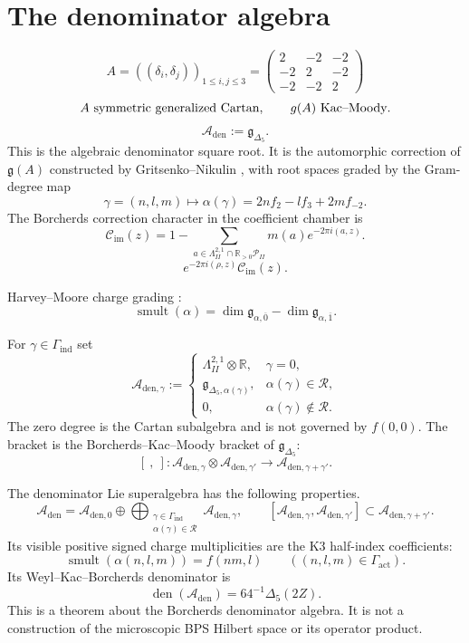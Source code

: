 \documentclass[11pt]{memoir}
\newcommand{\R}{\mathbb{R}} \newcommand{\La}{\Lambda}
\newcommand{\Poly}{\mathcal{P}}
\newcommand{\bkm}{\mathfrak{g}}
\newcommand{\smult}{\operatorname{smult}}
\newcommand{\autcor}{\mathfrak{g}_{\Delta_5}}
\begin{document}
\section{The denominator algebra}

$$A=((\delta_i,\delta_j))_{1\leq i,j\leq3}
=\begin{pmatrix}2&-2&-2\\-2&2&-2\\-2&-2&2\end{pmatrix}$$
$$A\ \hbox{symmetric generalized Cartan},\qquad
\bkm(A)\ \hbox{Kac--Moody}.$$
$$\mathcal A_{\mathrm{den}}:=\autcor.$$
This is the algebraic denominator square root.  It is the automorphic
correction of $\bkm(A)$ constructed by Gritsenko--Nikulin \cite{GN},
with root spaces graded by the Gram-degree map
$$
\gamma=(n,l,m)\longmapsto
\alpha(\gamma)=2nf_2-lf_3+2mf_{-2}.
$$
The Borcherds correction character in the coefficient chamber is
$$\mathcal C_{\mathrm{im}}(z)
=1-\sum_{a\in\La^{2,1}_{II}\cap\R_{>0}\Poly_{II}}
m(a)e^{-2\pi i(a,z)}.$$
$$e^{-2\pi i(\rho,z)}\mathcal C_{\mathrm{im}}(z).$$

Harvey--Moore charge grading \cite{HM}:
$$\smult(\alpha)
=\dim\mathfrak{g}_{\alpha,\overline 0}
-\dim\mathfrak{g}_{\alpha,\overline 1}.$$

\begin{definition}
For $\gamma\in\Gamma_{\mathrm{ind}}$ set
$$
\mathcal A_{\mathrm{den},\gamma}
:=
\begin{cases}
\La^{2,1}_{II}\otimes\R,&\gamma=0,\\
\mathfrak g_{\Delta_5,\alpha(\gamma)},&\alpha(\gamma)\in\mathcal R,\\
0,&\alpha(\gamma)\notin\mathcal R.
\end{cases}
$$
The zero degree is the Cartan subalgebra and is not governed by
\(f(0,0)\).  The bracket is the Borcherds--Kac--Moody bracket of
\(\autcor\):
$$
[\ ,\ ]:
\mathcal A_{\mathrm{den},\gamma}
\otimes
\mathcal A_{\mathrm{den},\gamma'}
\longrightarrow
\mathcal A_{\mathrm{den},\gamma+\gamma'}.
$$
\end{definition}

\begin{theorem}
\label{thm:bracket-level-square-root}
The denominator Lie superalgebra has the following properties.
$$
\mathcal A_{\mathrm{den}}
=\mathcal A_{\mathrm{den},0}\oplus
\bigoplus_{\substack{\gamma\in\Gamma_{\mathrm{ind}}\\
\alpha(\gamma)\in\mathcal R}}
\mathcal A_{\mathrm{den},\gamma},
\qquad
[\mathcal A_{\mathrm{den},\gamma},\mathcal A_{\mathrm{den},\gamma'}]
\subset \mathcal A_{\mathrm{den},\gamma+\gamma'}.
$$
Its visible positive signed charge multiplicities are the K3 half-index
coefficients:
$$
\smult(\alpha(n,l,m))=f(nm,l)
\qquad((n,l,m)\in\Gamma_{\mathrm{act}}).
$$
Its Weyl--Kac--Borcherds denominator is
$$
\operatorname{den}(\mathcal A_{\mathrm{den}})
=64^{-1}\Delta_5(2Z).
$$
This is a theorem about the Borcherds denominator algebra.  It is not a
construction of the microscopic BPS Hilbert space or its operator
product.
\end{theorem}
\end{document}
